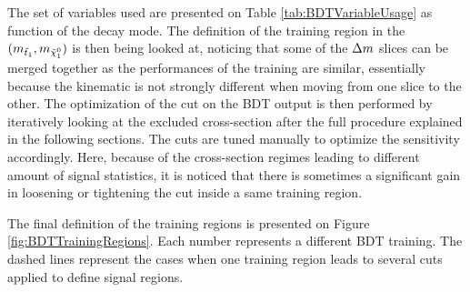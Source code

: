         The set of variables used are presented on Table \ref{tab:BDTVariableUsage} as function of the decay mode. The definition
        of the training region in the $(m_{\tilde{t}_1},m_{\tilde{\chi}_1^0})$ is then being looked at, noticing that some of the
        $\Delta m$ slices can be merged together as the performances of the training are similar, essentially because the kinematic
        is not strongly different when moving from one slice to the other. The optimization of the cut on the BDT output is then
        performed by iteratively looking at the excluded cross-section after the full procedure explained in the following sections.
        The cuts are tuned manually to optimize the sensitivity accordingly. Here, because of the cross-section regimes leading to 
        different amount of signal statistics, it is noticed that there is sometimes a significant gain in loosening or tightening
        the cut inside a same training region.

        The final definition of the training regions is presented on Figure \ref{fig:BDTTrainingRegions}. Each number represents a 
        different BDT training. The dashed lines represent the cases when one training region leads to several cuts applied to define
        signal regions.

